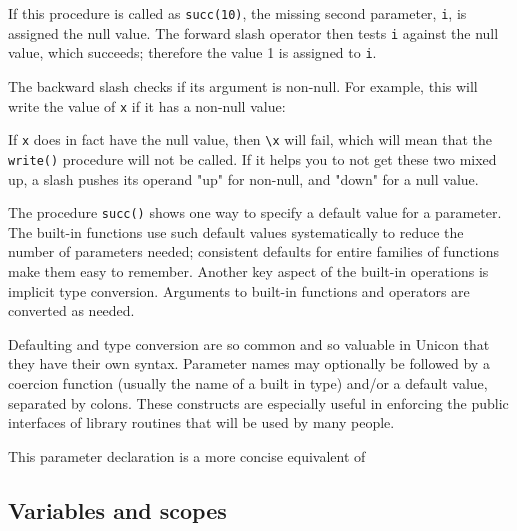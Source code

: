 If this procedure is called as \texttt{succ(10)}, the missing second
parameter, \texttt{i}, is assigned the null value. The forward slash
operator then tests \texttt{i} against the null value, which succeeds;
therefore the value 1 is assigned to \texttt{i}.

The backward slash checks if its argument is non-null. For example, this
will write the value of \texttt{x} if it has a non-null value:


If \texttt{x} does in fact have the null value, then \texttt{{\textbackslash}x} will fail, which will mean
that the \texttt{write()} procedure will not be called. If it helps you
to not get these two mixed up, a slash pushes its operand
"up" for non-null, and
"down" for a null value.

The procedure \texttt{succ()} shows one way to
specify a default value for a parameter. The built-in functions use
such default values systematically to reduce the number of parameters
needed; consistent defaults for entire families of functions make them
easy to remember. Another key aspect of the built-in operations is
implicit type conversion. Arguments to built-in functions and operators
are converted as needed.

Defaulting and type
conversion are so common and so valuable in Unicon that they have their
own syntax. Parameter names may optionally be followed by a coercion
function (usually the name of a built in type) and/or a default value,
separated by colons. These constructs are especially useful in
enforcing the public interfaces of library routines that will be used
by many people.


\noindent
This parameter declaration is a more concise equivalent of


\subsection*{Variables and scopes}

